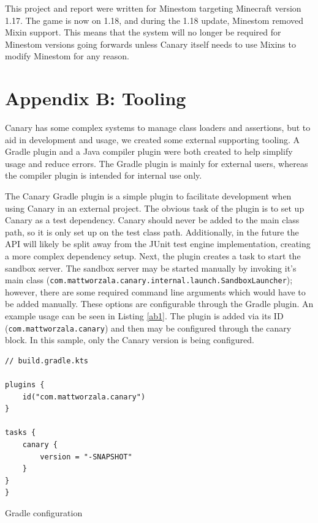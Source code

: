 \documentclass[12pt]{article}
\def\code#1{\texttt{#1}}
\begin{document}
\begin{onehalfspacing}


This project and report were written for Minestom targeting Minecraft
version 1.17. The game is now on 1.18, and during the 1.18 update,
Minestom removed Mixin support. This means that the system will no
longer be required for Minestom versions going forwards unless Canary
itself needs to use Mixins to modify Minestom for any reason.

\section{Appendix B: Tooling}

Canary has some complex systems to manage class loaders and assertions,
but to aid in development and usage, we created some external supporting
tooling. A Gradle plugin and a Java compiler plugin were both created to
help simplify usage and reduce errors. The Gradle plugin is mainly for
external users, whereas the compiler plugin is intended for internal use
only.

The Canary Gradle plugin is a simple plugin to facilitate development
when using Canary in an external project. The obvious task of the plugin
is to set up Canary as a test dependency. Canary should never be added
to the main class path, so it is only set up on the test class path.
Additionally, in the future the API will likely be split away from the
JUnit test engine implementation, creating a more complex dependency
setup. Next, the plugin creates a task to start the sandbox server. The
sandbox server may be started manually by invoking it's main class
(\code{com.mattworzala.canary.internal.launch.SandboxLauncher}); however, there
are some required command line arguments which would have to be added
manually. These options are configurable through the Gradle plugin. An
example usage can be seen in Listing \ref{ab1}. The plugin is added via its
ID (\code{com.mattworzala.canary}) and then may be configured through the
canary block. In this sample, only the Canary version is being
configured.

\begin{listing}[H]
\begin{verbatim}
// build.gradle.kts

plugins {
    id("com.mattworzala.canary")
}

tasks {
    canary {
        version = "-SNAPSHOT"
    }
}
}
\end{verbatim}
\caption{Gradle configuration}
\label{lst:ab1}
\end{listing}


\end{onehalfspacing}
\end{document}
